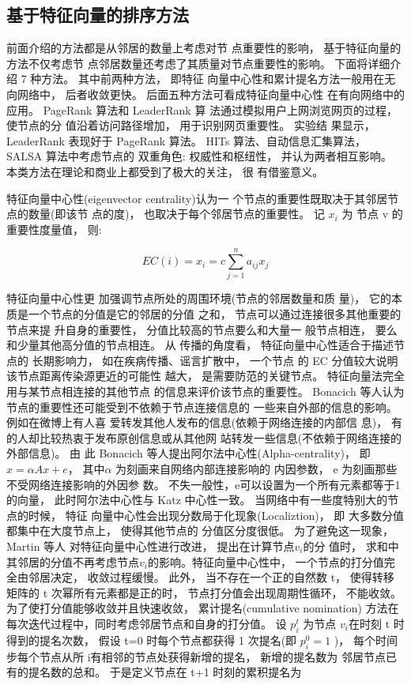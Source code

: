 	\subsection{基于特征向量的排序方法}
	前面介绍的方法都是从邻居的数量上考虑对节 点重要性的影响， 基于特征向量的方法不仅考虑节 点邻居数量还考虑了其质量对节点重要性的影响。 下面将详细介绍 7 种方法。 其中前两种方法， 即特征 向量中心性和累计提名方法一般用在无向网络中， 后者收敛更快。 后面五种方法可看成特征向量中心性 在有向网络中的应用。 PageRank 算法和 LeaderRank 算 法通过模拟用户上网浏览网页的过程， 使节点的分 值沿着访问路径增加， 用于识别网页重要性。 实验结 果显示， LeaderRank 表现好于 PageRank 算法。 HITs 算法、自动信息汇集算法， SALSA 算法中考虑节点的 双重角色: 权威性和枢纽性， 并认为两者相互影响。 本类方法在理论和商业上都受到了极大的关注， 很 有借鉴意义。

	特征向量中心性(eigenvector centrality)\parencite{Phillip1972Factoring}认为一 个节点的重要性既取决于其邻居节点的数量(即该节 点的度)， 也取决于每个邻居节点的重要性。 记 $x_i$ 为 节点 v 的重要性度量值， 则:

				$$EC(i)=x_i=c\sum\limits_{j=1}^n {a_{ij}x_j}$$

				特征向量中心性更 加强调节点所处的周围环境(节点的邻居数量和质 量)， 它的本质是一个节点的分值是它的邻居的分值 之和， 节点可以通过连接很多其他重要的节点来提 升自身的重要性， 分值比较高的节点要么和大量一 般节点相连， 要么和少量其他高分值的节点相连。 从 传播的角度看， 特征向量中心性适合于描述节点的 长期影响力， 如在疾病传播、谣言扩散中， 一个节点 的 EC 分值较大说明该节点距离传染源更近的可能性 越大， 是需要防范的关键节点。
				特征向量法完全用与某节点相连接的其他节点 的信息来评价该节点的重要性。 Bonacich 等人\parencite{Bonacich2001Eigenvector}认为 节点的重要性还可能受到不依赖于节点连接信息的 一些来自外部的信息的影响。 例如在微博上有人喜 爱转发其他人发布的信息(依赖于网络连接的内部信 息)， 有的人却比较热衷于发布原创信息或从其他网 站转发一些信息(不依赖于网络连接的外部信息)。 由 此 Bonacich 等人提出阿尔法中心性(Alpha-centrality)， 即 $x=\alpha Ax+e$， 其中$\alpha$ 为刻画来自网络内部连接影响的 内因参数， e 为刻画那些不受网络连接影响的外因参 数。 不失一般性，e可以设置为一个所有元素都等于1 的向量， 此时阿尔法中心性与 Katz 中心性一致。
				当网络中有一些度特别大的节点的时候， 特征 向量中心性会出现分数局于化现象(Localiztion)， 即 大多数分值都集中在大度节点上， 使得其他节点的 分值区分度很低。 为了避免这一现象， Martin 等人\parencite{Martin2015Localization} 对特征向量中心性进行改进， 提出在计算节点$v_i$的分 值时， 求和中其邻居的分值不再考虑节点$v_i$的影响。特征向量中心性中， 一个节点的打分值完全由邻居决定， 收敛过程缓慢。 此外， 当不存在一个正的自然数 t， 使得转移矩阵的 t 次幂所有元素都是正的时， 节点打分值会出现周期性循环， 不能收敛。 为了使打分值能够收敛并且快速收敛， 累计提名(cumulative nomination) \parencite{Wei2013Identifying}方法在每次迭代过程中，同时考虑邻居节点和自身的打分值。 设 $p_i^t$ 为节点 $v_i$在时刻 t 时得到的提名次数， 假设 t=0 时每个节点都获得 1 次提名(即 $p_i^0 =1$ )， 每个时间步每个节点从所 i有相邻的节点处获得新增的提名， 新增的提名数为 邻居节点已有的提名数的总和。 于是定义节点在 t+1 时刻的累积提名为

